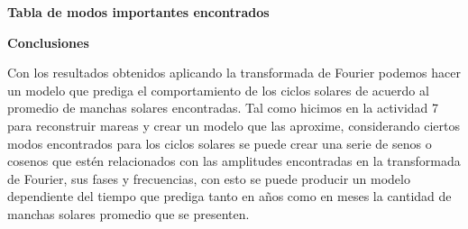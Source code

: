 \textbf{Tabla de modos importantes encontrados}
\begin{table}[ht!]
\centering
{}
\end{table}

\textbf{Conclusiones}

Con los resultados obtenidos aplicando la transformada de Fourier podemos hacer un modelo que prediga el comportamiento de los ciclos solares de acuerdo al promedio de manchas solares encontradas. Tal como hicimos en la actividad 7 para reconstruir mareas y crear un modelo que las aproxime, considerando ciertos modos encontrados para los ciclos solares se puede crear una serie de senos o cosenos que estén relacionados con las amplitudes encontradas en la transformada de Fourier, sus fases y frecuencias, con esto se puede producir un modelo dependiente del tiempo que prediga tanto en años como en meses la cantidad de manchas solares promedio que se presenten.

